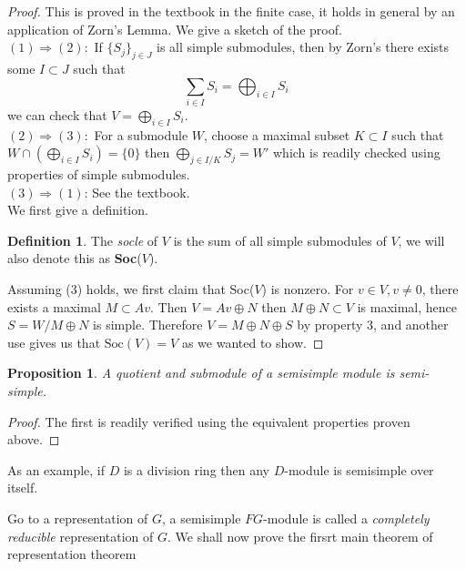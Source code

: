 \documentclass{article}
\theoremstyle{definition}
\newtheorem{definition}[theorem]{Definition}
\theoremstyle{remark}
\theoremstyle{plain}
\newtheorem{proposition}[theorem]{Proposition}
\newcommand{\ic}{\cap}
\begin{document}
 \begin{proof}
 This is proved in the textbook in the finite case, it holds in general by an application of Zorn's Lemma.
 We give a sketch of the proof.\\

 $(1) \Longrightarrow (2):$ If $\{S_j\}_{j \in J}$ is all simple submodules, then by Zorn's there exists some $I \subset J$ such that 
 \[ \sum_{i \in I} S_i = \bigoplus_{i \in I} S_i\]
 we can check that $V = \bigoplus_{i \in I} S_i$.\\

 $(2) \Longrightarrow (3):$ For a submodule $W$, choose a maximal subset $K \subset I$ such that $W \ic (\bigoplus_{i \in I} S_i) = \{0\}$ then $\bigoplus_{j \in I/K} S_j = W'$ which is readily checked using properties of simple submodules.\\

 $(3) \Longrightarrow (1)$: See the textbook.\\

 We first give a definition.
\begin{definition}
	The \textit{socle} of $V$ is the sum of all simple submodules of $V$, we will also denote this as \textbf{Soc}($V$).
\end{definition}
Assuming (3) holds, we first claim that Soc($V$) is nonzero.
For $v \in V, v \neq 0$, there exists a maximal $M \subset Av$.
Then $V = Av \oplus N$ then $M \oplus N \subset V$ is maximal, hence $S = W/M \oplus N$ is simple.
Therefore $V = M \oplus N \oplus S$ by property 3, and another use gives us that $\text{Soc}(V) = V$ as we wanted to show.

\end{proof}

\begin{proposition}
	A quotient and submodule of a semisimple module is semi-simple.\end{proposition}

\begin{proof}
	The first is readily verified using the equivalent properties proven above. 
\end{proof}

As an example, if $D$ is a division ring then any $D$-module is semisimple over itself.

Go to a representation of $G$, a semisimple $FG$-module is called a \textit{completely reducible} representation of $G$.
We shall now prove the firsrt main theorem of representation theorem
\end{document}
